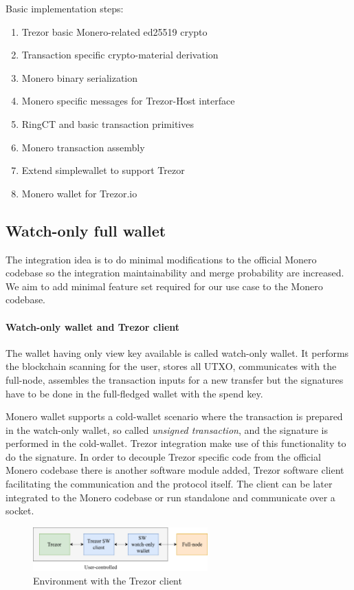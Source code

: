 \documentclass[]{article}
\begin{document}
\;
\noindent Basic implementation steps:
\begin{enumerate}
	\item Trezor basic Monero-related ed25519 crypto
	\item Transaction specific crypto-material derivation
	\item Monero binary serialization
	\item Monero specific messages for Trezor-Host interface
	\item RingCT and basic transaction primitives
	\item Monero transaction assembly
	\item Extend simplewallet to support Trezor
	\item Monero wallet for Trezor.io 
\end{enumerate}

\subsection{Watch-only full wallet}
The integration idea is to do minimal modifications to the official Monero codebase so the integration maintainability and merge probability are increased. We aim to add minimal feature set required for our use case to the Monero codebase. 

\paragraph{Watch-only wallet and Trezor client} 
The wallet having only view key available is called watch-only wallet. It performs the blockchain scanning for the user, stores all UTXO, communicates with the full-node, assembles the transaction inputs for a new transfer but the signatures have to be done in the full-fledged wallet with the spend key. 

Monero wallet supports a cold-wallet scenario where the transaction is prepared in the watch-only wallet, so called \emph{unsigned transaction}, and the signature is performed in the cold-wallet. Trezor integration make use of this functionality to do the signature. In order to decouple Trezor specific code from the official Monero codebase there is another software module added, Trezor software client facilitating the communication and the protocol itself. The client can be later integrated to the Monero codebase or run standalone and communicate over a socket.

\begin{figure}[H]
	\centering
	\includegraphics[width=0.6\textwidth, angle=0]{trezor-int.pdf}
	\caption{Environment with the Trezor client}
\end{figure}
\end{document}
